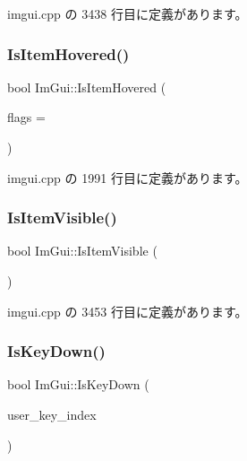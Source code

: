  imgui.\+cpp の 3438 行目に定義があります。

\mbox{\label{namespace_im_gui_ac9a400eff3a9561d95e80486c52a660b}} 
\subsubsection{\texorpdfstring{Is\+Item\+Hovered()}{IsItemHovered()}}
{\footnotesize\ttfamily bool Im\+Gui\+::\+Is\+Item\+Hovered (\begin{DoxyParamCaption}\item[{\mbox{\hyperlink{imgui_8h_a3a8f688665e5ea0bd9700e1251580a2c}{Im\+Gui\+Hovered\+Flags}}}]{flags = {} }\end{DoxyParamCaption})}



 imgui.\+cpp の 1991 行目に定義があります。

\mbox{\label{namespace_im_gui_a0e9273fc53bdf7ca39d59cdb657c3c2f}} 
\subsubsection{\texorpdfstring{Is\+Item\+Visible()}{IsItemVisible()}}
{\footnotesize\ttfamily bool Im\+Gui\+::\+Is\+Item\+Visible (\begin{DoxyParamCaption}{ }\end{DoxyParamCaption})}



 imgui.\+cpp の 3453 行目に定義があります。

\mbox{\label{namespace_im_gui_a633d848504c89e7756ddd33474bc78d2}} 
\subsubsection{\texorpdfstring{Is\+Key\+Down()}{IsKeyDown()}}
{\footnotesize\ttfamily bool Im\+Gui\+::\+Is\+Key\+Down (\begin{DoxyParamCaption}\item[{int}]{user\+\_\+key\+\_\+index }\end{DoxyParamCaption})}



